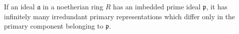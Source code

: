If an ideal $\mathfrak{a}$ in a noetherian ring $R$ has an imbedded prime ideal $\mathfrak{p}$, it has infinitely many irredundant primary representations which differ only in the primary component belonging to $\mathfrak{p}$.
